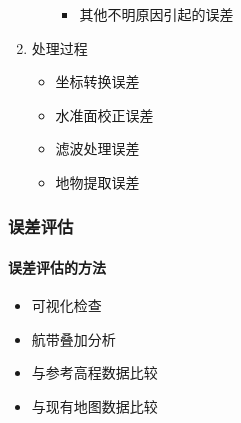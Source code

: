 \begin{multicols}{2}
\begin{enumerate}
\begin{enumerate}
\begin{itemize}
						\item 其他不明原因引起的误差
					\end{itemize}
			\end{enumerate}
		\item {\cukai 处理过程}
			\begin{itemize}
				\item 坐标转换误差
				\item 水准面校正误差
				\item 滤波处理误差
				\item 地物提取误差
			\end{itemize}
	\end{enumerate}
\end{multicols}

\subsubsection{误差评估}

\paragraph{误差评估的方法}
\begin{itemize}
	\item 可视化检查
	\item 航带叠加分析
	\item 与参考高程数据比较
	\item 与现有地图数据比较
\end{itemize}

